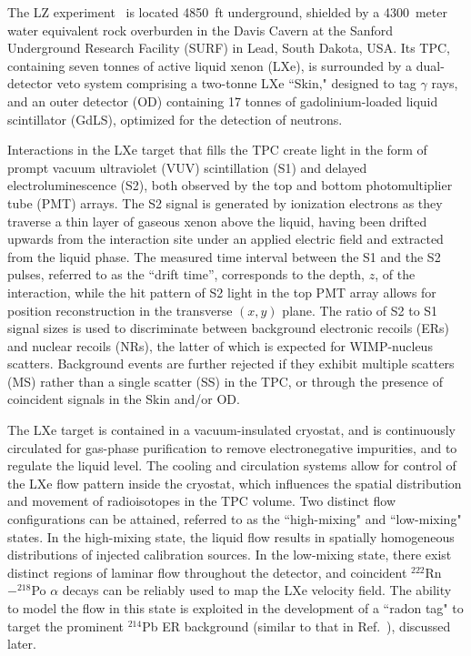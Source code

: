 \documentclass[%
 reprint,
 superscriptaddress,
 amsmath,amssymb,
 prl,
floatfix,
]{revtex4-2}
\begin{document}
The LZ experiment~\cite{lzcdr,*lztdr,*LZExperiment} is located 4850~ft underground, shielded by a 4300~meter water equivalent rock overburden in the Davis Cavern at the Sanford Underground Research Facility (SURF) in Lead, South Dakota, USA. Its TPC, containing seven tonnes of active liquid xenon (LXe), is surrounded by a dual-detector veto system comprising a two-tonne LXe ``Skin," designed to tag $\gamma$ rays, and an outer detector (OD) containing 17 tonnes of gadolinium-loaded liquid scintillator (GdLS), optimized for the detection of neutrons. 

Interactions in the LXe target that fills the TPC create light in the form of prompt vacuum ultraviolet (VUV) scintillation (S1) and delayed electroluminescence (S2), both observed by the top and bottom photomultiplier tube (PMT) arrays. The S2 signal is generated by ionization electrons as they traverse a thin layer of gaseous xenon above the liquid, having been drifted upwards from the interaction site under an applied electric field and extracted from the liquid phase. The measured time interval between the S1 and the S2 pulses, referred to as the ``drift time”, corresponds to the depth, $z$, of the interaction, while the hit pattern of S2 light in the top PMT array allows for position reconstruction in the transverse $(x,y)$ plane. The ratio of S2 to S1 signal sizes is used to discriminate between background electronic recoils (ERs) and nuclear recoils (NRs), the latter of which is expected for WIMP-nucleus scatters. Background events are further rejected if they exhibit multiple scatters (MS) rather than a single scatter (SS) in the TPC, or through the presence of coincident signals in the Skin and/or OD.

The LXe target is contained in a vacuum-insulated cryostat, and is continuously circulated for gas-phase purification to remove electronegative impurities, and to regulate the liquid level. The cooling and circulation systems allow for control of the LXe flow pattern inside the cryostat, which influences the spatial distribution and movement of radioisotopes in the TPC volume. Two distinct flow configurations can be attained, referred to as the ``high-mixing" and ``low-mixing" states. In the high-mixing state, the liquid flow results in spatially homogeneous distributions of injected calibration sources. In the low-mixing state, there exist distinct regions of laminar flow throughout the detector, and coincident $^{222}$Rn$-^{218}$Po $\alpha$ decays can be reliably used to map the LXe velocity field. The ability to model the flow in this state is exploited in the development of a ``radon tag" to target the prominent $^{214}$Pb ER background (similar to that in Ref.~\cite{XENON_radonVeto}), discussed later.
\end{document}
